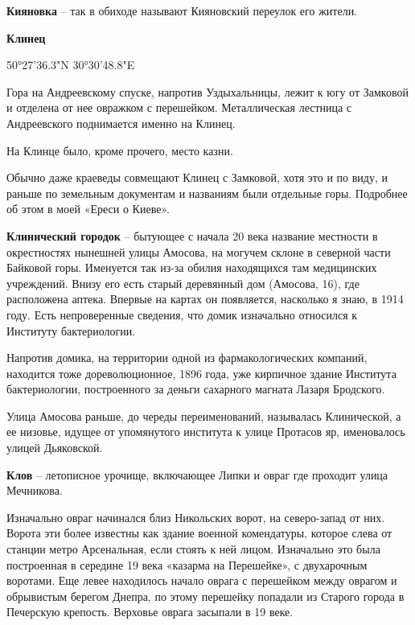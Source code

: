 \medskip

\textbf{Кияновка} – так в обиходе называют Кияновский переулок его жители.\\

\medskip

\textbf{Клинец}

50°27'36.3"N 30°30'48.8"E

Гора на Андреевскому спуске, напротив Уздыхальницы, лежит к югу от Замковой и отделена от нее овражком с перешейком. Металлическая лестница с Андреевского поднимается именно на Клинец.

На Клинце было, кроме прочего, место казни.

Обычно даже краеведы совмещают Клинец с Замковой, хотя это и по виду, и раньше по земельным документам и названиям были отдельные горы. Подробнее об этом в моей «Ереси о Киеве».\\

\medskip

\textbf{Клинический городок} – бытующее с начала 20 века название местности в окрестностях нынешней улицы Амосова, на могучем склоне в северной части Байковой горы. Именуется так из-за обилия находящихся там медицинских учреждений. Внизу его есть старый деревянный дом (Амосова, 16), где расположена аптека. Впервые на картах он появляется, насколько я знаю, в 1914 году. Есть непроверенные сведения, что домик изначально относился к Институту бактериологии.

Напротив домика, на территории одной из фармакологических компаний, находится тоже дореволюционное, 1896 года, уже кирпичное здание Института бактериологии, построенного за деньги сахарного магната Лазаря Бродского.

Улица Амосова раньше, до череды переименований, называлась Клинической, а ее низовье, идущее от упомянутого института к улице Протасов яр, именовалось улицей Дьяковской.\\

\medskip

\textbf{Клов} – летописное урочище, включающее Липки и овраг где проходит улица Мечникова. 

Изначально овраг начинался близ Никольских ворот, на северо-запад от них. Ворота эти более известны как здание военной комендатуры, которое слева от станции метро Арсенальная, если стоять к ней лицом. Изначально это была построенная в середине 19 века «казарма на Перешейке», с двухарочным воротами. Еще левее находилось начало оврага с перешейком между оврагом и обрывистым берегом Днепра, по этому перешейку попадали из Старого города в Печерскую крепость. Верховье оврага засыпали в 19 веке.

